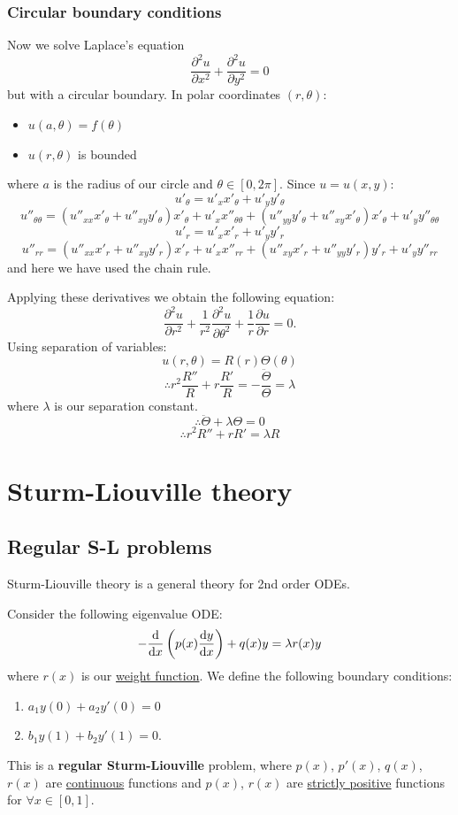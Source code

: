 \documentclass{article}
\begin{document}
\subsubsection{Circular boundary conditions}
Now we solve Laplace's equation
$$\frac{\partial^2 u}{\partial x^2}+\frac{\partial^2 u}{\partial y^2}=0$$
but with a circular boundary. In polar coordinates $(r,\theta)$:
\begin{itemize}
    \item $u(a,\theta)=f(\theta)$
    \item $u(r,\theta)$ is bounded
\end{itemize}
where $a$ is the radius of our circle and $\theta\in[0,2\pi]$. Since $u=u(x,y)$:
$$u'_{\theta}=u'_x x'_{\theta}+u'_y y'_{\theta}$$
$$u''_{\theta\theta}=(u''_{xx}x'_{\theta}+u''_{xy}y'_{\theta})x'_{\theta}
+u'_x x''_{\theta\theta}+(u''_{yy}y'_{\theta}+u''_{xy}x'_{\theta})x'_{\theta}+u'_y y''_{\theta\theta}$$
$$u'_r=u'_x x'_r+u'_y y'_r$$
$$u''_{rr}=(u''_{xx}x'_r+u''_{xy}y'_r)x'_r
+u'_x x''_{rr}+(u''_{xy}x'_r+u''_{yy}y'_r)y'_r+u'_y y''_{rr}$$
and here we have used the chain rule.

\newpage

Applying these derivatives we obtain the following equation:
$$\frac{\partial^2 u}{\partial r^2}+\frac{1}{r^2}\frac{\partial^2 u}{\partial\theta^2}
+\frac{1}{r}\frac{\partial u}{\partial r}=0.$$
Using separation of variables:
$$u(r,\theta)=R(r)\Theta(\theta)$$
$$\therefore r^2\frac{R''}{R}+r\frac{R'}{R}=-\frac{\ddot{\Theta}}{\Theta}=\lambda$$
where $\lambda$ is our separation constant.
$$\therefore\ddot{\Theta}+\lambda\Theta=0$$
$$\therefore r^2 R''+rR'=\lambda R$$

\newpage

\section{Sturm-Liouville theory}

\subsection{Regular S-L problems}
Sturm-Liouville theory is a general theory for 2nd order ODEs.

Consider the following eigenvalue ODE:
$$-\dv{x}\left(p(x)\dv{y}{x}\right)+q(x)y=\lambda r(x)y$$
where $r(x)$ is our \underline{weight function}.
We define the following boundary conditions:
\begin{enumerate}
    \item $a_1 y(0)+a_2 y'(0)=0$

    \item $b_1 y(1)+b_2 y'(1)=0.$
\end{enumerate}
This is a \textbf{regular Sturm-Liouville} problem, where $p(x)$, $p'(x)$, $q(x)$, $r(x)$ are \underline{continuous} functions and $p(x)$, $r(x)$ are \underline{strictly positive} functions for $\forall x\in[0,1]$.
\end{document}
